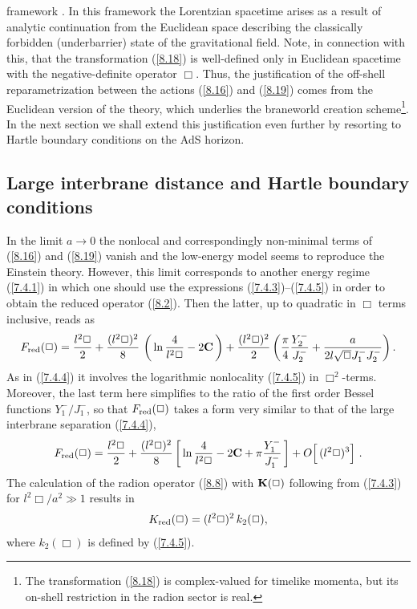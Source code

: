 \documentclass[a4paper,preprint,nofootinbib,
                 showpacs,preprintnumbers,amsmath,amssymb]{revtex4}
\begin{document}
framework \cite{GarSas,HHR1,HHR2}. In this framework the 
Lorentzian spacetime arises as a result of analytic continuation 
from the Euclidean space describing the classically forbidden 
(underbarrier) state of the gravitational field. Note, in 
connection with this, that the transformation (\ref{8.18}) is 
well-defined only in Euclidean spacetime with the 
negative-definite operator $\Box$. Thus, the justification of the 
off-shell reparametrization between the actions (\ref{8.16}) and 
(\ref{8.19}) comes from the Euclidean version of the theory, which 
underlies the braneworld creation scheme\footnote{The 
transformation (\ref{8.18}) is complex-valued for timelike 
momenta, but its on-shell restriction in the radion sector is 
real.}. In the next section we shall extend this justification 
even further by resorting to Hartle boundary conditions on the AdS 
horizon. 
 
\subsection{Large interbrane distance and Hartle boundary conditions 
\label{hartle}} 
 
In the limit $a\to 0$ the nonlocal and correspondingly 
non-minimal terms of (\ref{8.16}) and (\ref{8.19}) vanish and the low-energy 
model seems to reproduce the Einstein theory. However, this limit corresponds 
to another energy regime (\ref{7.4.1}) in which one should use the expressions 
(\ref{7.4.3})--(\ref{7.4.5}) in order to obtain the reduced operator 
(\ref{8.2}).  Then the latter, up to quadratic in $\Box$ terms inclusive, 
reads as 
    \begin{equation} 
    F_{\rm red}(\Box)=\frac{l^2\Box}2 
    +\frac{(l^2\Box)^2}8\, 
    \left(\,\ln\frac4{l^2\Box}-2{\bf C}\,\right) 
    +\frac{(l^2\Box)^2}2 
    \left(\frac\pi4\frac{Y_2^-}{J_2^-}+ 
    \frac{a}{2l\sqrt{\Box}J_1^-J_2^-}\right).  \label{8.20} 
    \end{equation} 
As in (\ref{7.4.4}) it involves the logarithmic nonlocality 
(\ref{7.4.5}) in $\Box^2$-terms. Moreover, the last term here 
simplifies to the ratio of the first order Bessel functions 
$Y_1^-/J_1^-$, so that $F_{\rm red}(\Box)$ takes a form very 
similar to that of the large interbrane separation (\ref{7.4.4}), 
    \begin{eqnarray} 
    F_{\rm red}(\Box)=\frac{l^2\Box}2 
    +\frac{(l^2\Box)^2}8\left[\, 
    \ln\frac4{l^2\Box}-2{\bf C} 
    +\pi\frac{Y_1^-}{J_1^-}\,\right] 
    +O\Big[\,(l^2\Box)^3\Big]\ .              \label{8.21} 
    \end{eqnarray} 
The calculation of the radion operator (\ref{8.8}) with ${\bf 
K}(\Box)$ following from (\ref{7.4.3}) for $l^2\Box/a^2\gg1$ 
results in 
    \begin{eqnarray} 
    K_{\rm red}(\Box)=(l^2\Box)^2\,k_2(\Box),  \label{8.22} 
    \end{eqnarray} 
where $k_2(\Box)$ is defined by (\ref{7.4.5}). 
 
\end{document}
